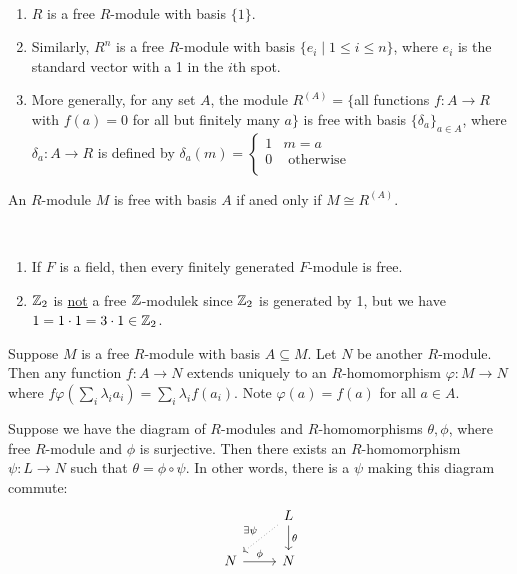\documentclass[x11names,reqno,14pt]{extarticle}
\begin{document}
\exm\,

\begin{enumerate}

\item $R$ is a free $R$-module with basis $\{1\}$. 

\item Similarly, $R^n$ is a free $R$-module with basis $\{e_i \mid 1 \leq i \leq n\}$, where $e_i$ is the standard vector with a 1 in the $i$th spot. 

\item More generally, for any set $A$, the module $R^{(A)} = \{$all functions $f:A\to R$ with $f(a) = 0$ for all but finitely many $a\}$ is free with basis $\{\delta_a\}_{a\in A}$, where $\delta_a:A\to R$ is defined by $\delta_a(m) = \begin{cases} 1 & m = a \\ 0 &\text{ otherwise} \\ \end{cases}$

\end{enumerate}

\rem

An $R$-module $M$ is free with basis $A$ if aned only if $M \cong R^{(A)}$. 

\exm\,
\begin{enumerate}

\item If $F$ is a field, then every finitely generated $F$-module is free. 

\item $\mathbb{Z}_2$ is \underline{not} a free $\mathbb{Z}$-modulek since $\mathbb{Z}_2$ is generated by 1, but we have $1 = 1\cdot 1 = 3\cdot 1 \in \mathbb{Z}_2$. 

\end{enumerate}

\rem 

Suppose $M$ is a free $R$-module with basis $A\subseteq M$. Let $N$ be another $R$-module. Then any function $f:A\to N$ extends uniquely to an $R$-homomorphism $\varphi:M\to N$ where $f\varphi(\sum_i\lambda_ia_i) = \sum_i\lambda_if(a_i)$. Note $\varphi(a) = f(a)$ for all $a \in A$. 

\prop

Suppose we have the diagram of $R$-modules and $R$-homomorphisms $\theta,\phi$, where free $R$-module and $\phi$ is surjective. Then there exists an $R$-homomorphism $\psi:L\to N$ such that $\theta = \phi\circ \psi$. In other words, there is a $\psi$ making this diagram commute:
\[
\begin{tikzcd}
& L\ar[dl, dotted, "\exists \psi"']\ar[d, "\theta"] \\
N \ar[r, "\phi"] & N\\ 
\end{tikzcd}
\]
\proof
\end{document}
